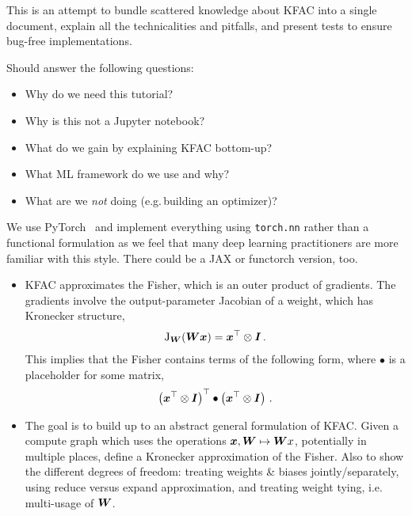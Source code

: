 This is an attempt to bundle scattered knowledge about KFAC into a single document, explain all the technicalities and pitfalls, and present tests to ensure bug-free implementations.

Should answer the following questions:
\begin{itemize}
\item Why do we need this tutorial?
\item Why is this not a Jupyter notebook?
\item What do we gain by explaining KFAC bottom-up?
\item What ML framework do we use and why?
\item What are we \emph{not} doing (e.g.\,building an optimizer)?
\end{itemize}

We use PyTorch~\cite{paszke2019pytorch} and implement everything using \texttt{torch.nn} rather than a functional formulation as we feel that many deep learning practitioners are more familiar with this style.
There could be a JAX or functorch version, too.

\begin{itemize}
\item KFAC approximates the Fisher, which is an outer product of gradients. The gradients involve the output-parameter Jacobian of a weight, which has Kronecker structure,
  \begin{align}
    \mathrm{J}_{{\bm{W}}}({\bm{W}} {\bm{x}}) = {\bm{x}}^{\top} \otimes {\bm{I}}\,.
  \end{align}
  This implies that the Fisher contains terms of the following form, where $\bullet$ is a placeholder for some matrix,
  \begin{align}
    \left(
    {\bm{x}}^{\top}\otimes {\bm{I}}
    \right)^{\top}
    \bullet
    \left(
    {\bm{x}}^{\top}\otimes {\bm{I}}
    \right)\,.
  \end{align}

\item The goal is to build up to an abstract general formulation of KFAC.
  Given a compute graph which uses the operations ${\bm{x}}, {\bm{W}} \mapsto {\bm{W}} x$, potentially in multiple places, define a Kronecker approximation of the Fisher.
  Also to show the different degrees of freedom: treating weights \& biases jointly/separately, using reduce versus expand approximation, and treating weight tying, i.e.
  multi-usage of ${\bm{W}}$.

\end{itemize}
